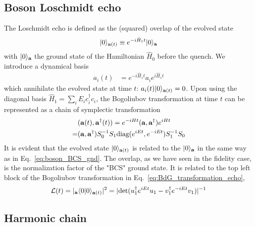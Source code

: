 \subsection{Boson Loschmidt echo}
\label{app_sub:boson_Loschmidt_echo}

The Loschmidt echo is defined as the (squared) overlap of the evolved state
\begin{equation}\begin{aligned}
|0\rangle_{{\bf a}(t)}\equiv e^{-i\hat{H}_1t}|0\rangle_{\bf a}
\end{aligned}\end{equation}
with $|0\rangle_{\bf a}$ the ground state of the Hamiltonian $\hat{H}_0$ before the quench. We introduce a dynamical basis
\begin{equation}\begin{aligned}
a_i(t)&=e^{-i\hat{H}_1t}a_ie^{i\hat{H}_1t}
\end{aligned}\end{equation}
which annihilate the evolved state at time $t$: $a_i(t)|0\rangle_{{\bf a}(t)}=0$. Upon using the diagonal basis $\hat{H}_1=\sum_iE_ic_i^\dagger c_i$, the Bogoliubov transformation at time $t$ can be represented as a chain of symplectic transformation
\begin{equation}\begin{aligned}
\label{eq:BdG_transformation_echo}
&({\bf a}(t),{\bf a}^\dagger(t))=e^{-iHt}
({\bf a} , {\bf a}^\dagger)e^{iHt} \\
=&({\bf a},{\bf a}^\dagger)S_0^{-1}S_1\text{diag}(e^{iEt},e^{-iEt})S_1^{-1}S_0
\end{aligned}\end{equation}
It is evident that the evolved state $|0\rangle_{{\bf a}(t)}$ is related to the $|0\rangle_{{\bf a}}$ in the same way as in Eq.~\eqref{eq:boson_BCS_gnd}. The overlap, as we have seen in the fidelity case, is the normalization factor of the "BCS" ground state. It is related to the top left block of the Bogoliubov transformation in Eq.~\eqref{eq:BdG_transformation_echo},
\begin{equation}\begin{aligned}
\label{eq:echo_t}
\mathcal{L}(t)=|_{\bf a}\langle0|0\rangle_{{\bf a}(t)}|^2=|\text{det}(u_1^\dagger e^{iEt}u_1-v_1^\dagger e^{-iEt}v_1)|^{-1}
\end{aligned}\end{equation}

\subsection{Harmonic chain} 
\label{app_sub:harmonic_chain}

